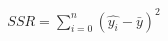 \documentclass[10pt]{article}
\begin{document}
\begin{align*}SSR = {\sum\limits_{i=0}^n} (\hat{y_i} - \bar{y})^2\end{align*}
\end{document}
